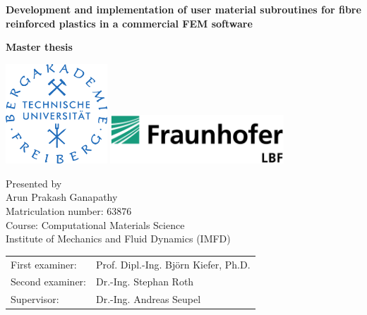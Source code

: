 \begin{titlepage}
	
	\begin{center}
	  	

	  	
	  	\Large{ \textbf{Development and implementation of user material subroutines for fibre reinforced plastics in a commercial FEM software} }
	  	
	  	\vspace{0.4cm}
	  	
	  	\Large{ \textbf{Master thesis}}
	  	
	  	\vspace{1cm}
	  	
	 \begin{center} \hspace*{0.8cm}	\includegraphics[width=38mm]{logo.png} \hspace*{0.8cm} \vspace{1cm} \centering \includegraphics[width=65mm]{lbf.png} \end{center}
	
	   \vspace{0.4cm}
	  \large { Presented by }\\  
	 \large { Arun Prakash Ganapathy }\\
	  \large { Matriculation number: 63876 } \\
	  \large{Course: Computational Materials Science } \\
	    \large{Institute of Mechanics and Fluid Dynamics (IMFD)}\\
	    	\vspace{1.5cm}
	    	
   \begin{tabular}{l l}

	\vspace{0.2cm}
    \hspace*{1cm} \large{First examiner:} & \hspace*{1cm}\large{Prof. Dipl.-Ing. Björn Kiefer, Ph.D.}\\
    \vspace{0.2cm}
    \hspace*{1cm} \large{Second examiner:} & \hspace*{1cm}\large{Dr.-Ing. Stephan Roth}\\
	\vspace{0.2cm}
    \hspace*{1cm} \large{Supervisor:} & \hspace*{1cm}\large{Dr.-Ing. Andreas Seupel} \\


\end{tabular}
\end{center}
\end{titlepage}
